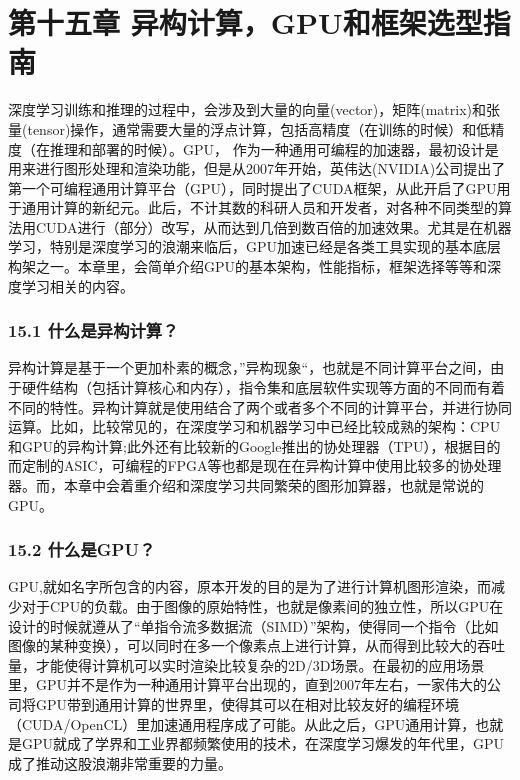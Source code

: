\chapter{第十五章 异构计算，GPU和框架选型指南}\label{ux7b2cux5341ux4e94ux7ae0-ux5f02ux6784ux8ba1ux7b97-gpuux548cux6846ux67b6ux9009ux578bux6307ux5357}

深度学习训练和推理的过程中，会涉及到大量的向量(vector)，矩阵(matrix)和张量(tensor)操作，通常需要大量的浮点计算，包括高精度（在训练的时候）和低精度（在推理和部署的时候）。GPU，
作为一种通用可编程的加速器，最初设计是用来进行图形处理和渲染功能，但是从2007年开始，英伟达(NVIDIA)公司提出了第一个可编程通用计算平台（GPU），同时提出了CUDA框架，从此开启了GPU用于通用计算的新纪元。此后，不计其数的科研人员和开发者，对各种不同类型的算法用CUDA进行（部分）改写，从而达到几倍到数百倍的加速效果。尤其是在机器学习，特别是深度学习的浪潮来临后，GPU加速已经是各类工具实现的基本底层构架之一。本章里，会简单介绍GPU的基本架构，性能指标，框架选择等等和深度学习相关的内容。

\subsection{15.1
什么是异构计算？}\label{ux4ec0ux4e48ux662fux5f02ux6784ux8ba1ux7b97}

异构计算是基于一个更加朴素的概念，''异构现象``，也就是不同计算平台之间，由于硬件结构（包括计算核心和内存），指令集和底层软件实现等方面的不同而有着不同的特性。异构计算就是使用结合了两个或者多个不同的计算平台，并进行协同运算。比如，比较常见的，在深度学习和机器学习中已经比较成熟的架构：CPU和GPU的异构计算;此外还有比较新的Google推出的协处理器（TPU），根据目的而定制的ASIC，可编程的FPGA等也都是现在在异构计算中使用比较多的协处理器。而，本章中会着重介绍和深度学习共同繁荣的图形加算器，也就是常说的GPU。

\subsection{15.2 什么是GPU？}\label{ux4ec0ux4e48ux662fgpu}

GPU,就如名字所包含的内容，原本开发的目的是为了进行计算机图形渲染，而减少对于CPU的负载。由于图像的原始特性，也就是像素间的独立性，所以GPU在设计的时候就遵从了``单指令流多数据流（SIMD）''架构，使得同一个指令（比如图像的某种变换），可以同时在多一个像素点上进行计算，从而得到比较大的吞吐量，才能使得计算机可以实时渲染比较复杂的2D/3D场景。在最初的应用场景里，GPU并不是作为一种通用计算平台出现的，直到2007年左右，一家伟大的公司将GPU带到通用计算的世界里，使得其可以在相对比较友好的编程环境（CUDA/OpenCL）里加速通用程序成了可能。从此之后，GPU通用计算，也就是GPU就成了学界和工业界都频繁使用的技术，在深度学习爆发的年代里，GPU成了推动这股浪潮非常重要的力量。

